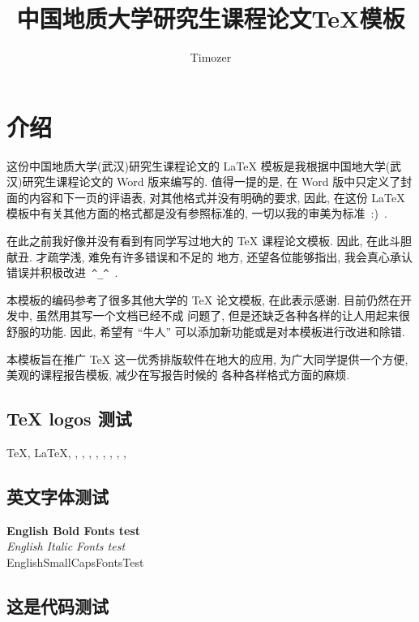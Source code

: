 \documentclass{cugrep}
\title{中国地质大学研究生课程论文\TeX{}模板}
\author{Timozer}
\begin{document}
\maketitle

\frontmatter
{}
\makeabstract 

\tableofcontents
\clearpage

\mainmatter
\chapter{介绍}
这份中国地质大学(武汉)研究生课程论文的 \LaTeX{} 模板是我根据中国地大学(武汉)研究生课程论文的 {\sc Word} 版来编写的. 
值得一提的是, 在 {\sc Word} 版中只定义了封面的内容和下一页的评语表, 对其他格式并没有明确的要求, 因此, 
在这份 \LaTeX{} 模板中有关其他方面的格式都是没有参照标准的, 一切以我的审美为标准~:)~.

在此之前我好像并没有看到有同学写过地大的 \TeX{} 课程论文模板. 因此, 在此斗胆献丑. 才疏学浅, 难免有许多错误和不足的
地方, 还望各位能够指出, 我会真心承认错误并积极改进~\verb|^_^|~.

本模板的编码参考了很多其他大学的 \TeX{} 论文模板, 在此表示感谢. 目前仍然在开发中, 虽然用其写一个文档已经不成
问题了, 但是还缺乏各种各样的让人用起来很舒服的功能. 因此, 希望有 ``牛人'' 可以添加新功能或是对本模板进行改进和除错.

本模板旨在推广 \TeX{} 这一优秀排版软件在地大的应用, 为广大同学提供一个方便, 美观的课程报告模板, 减少在写报告时候的
各种各样格式方面的麻烦. 

\section{\TeX{} logos 测试}
\TeX{}, \LaTeX{}, \LaTeXe{}, \XeTeX{}, \XeLaTeX{}, \LuaTeX{}, \LuaLaTeX{}, \MF{}, \MP{}, \BIBTEX, \AMSTEX

\section{英文字体测试}
{
\noindent
{\bf English Bold Fonts test} \\
{\textit{English Italic Fonts test}}\\
{\sc EnglishSmallCapsFontsTest}}

\section{这是代码测试}
\end{document}
